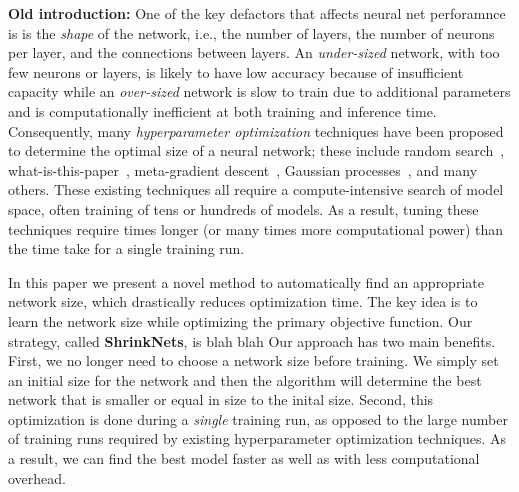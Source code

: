 {\bf Old introduction:}
One of the key defactors that affects neural net perforamnce is  is the {\it shape} of the network, 
i.e., the number of layers, the number of neurons per layer, and the connections between
layers.
An {\it under-sized} network, with too few neurons or layers,
 is likely to have low accuracy because of insufficient 
capacity while an {\it over-sized} network is slow to train due to additional 
parameters and is computationally inefficient at both training and inference time.
Consequently, many {\it hyperparameter optimization} techniques have been proposed to determine the optimal size of
a neural network; these include random search~\cite{paper-on-random-is-good-enough}, 
what-is-this-paper~\cite{Bengio2012a}, 
meta-gradient descent~\cite{Pedregosa2016},
Gaussian processes~\cite{Bergstra2011a}, and many others.
These existing techniques all require a compute-intensive search of 
model space,  often training of tens or hundreds of models.
As a result, tuning these techniques require times 
longer (or many times more computational power) 
than the time take for a single training run.

In this paper we present a novel method to automatically find an appropriate
network size, which drastically reduces optimization time. 
The key idea is to learn the network size while optimizing the primary objective function.
Our strategy, called \textbf{ShrinkNets}, is blah blah 
Our approach has two main benefits. 
First, we no longer need to choose a network size before training.
We simply set an initial size for the network and then the algorithm will
determine the best network that is smaller or equal in size to the inital size.
Second, this optimization is done during a {\it single} training run, as opposed to the large number of training runs
required by existing hyperparameter optimization 
techniques.  As a result, we can find the best model 
faster as well as with less computational overhead.

